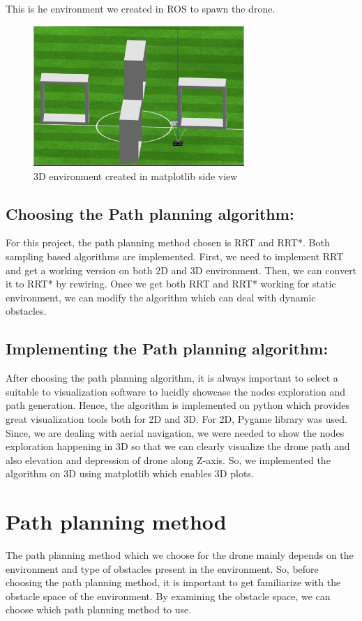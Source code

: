 \documentclass{IEEEtran}
\begin{document}
\newline
This is he environment we created in ROS to spawn the drone.
\newpage
\begin{figure}[h]
    \centering
    \includegraphics[width=8cm]{gazebo}
    \caption{3D environment created in matplotlib side view}
    \label{fig:3D environment created in matplotlib}
\end{figure}
\subsection{\textbf{Choosing the Path planning algorithm:}}
For this project, the path planning method chosen is RRT and RRT*. Both sampling based algorithms are implemented. First, we need to implement RRT and get a working version on both 2D and 3D environment. Then, we can convert it to RRT* by rewiring. Once we get both RRT and RRT* working for static environment, we can modify the algorithm which can deal with dynamic obstacles.

\subsection{\textbf{Implementing the Path planning algorithm:}}
After choosing the path planning algorithm, it is always important to select a suitable to visualization software to lucidly showcase the nodes exploration and path generation. Hence, the algorithm is implemented on python which provides great visualization tools both for 2D and 3D. For 2D, Pygame library was used. Since, we are dealing with aerial navigation, we were needed to show the nodes exploration happening in 3D so that we can clearly visualize the drone path and also elevation and depression of drone along Z-axis. So, we implemented the algorithm on 3D using matplotlib which enables 3D plots.
\section{\textbf{Path planning method}} 
The path planning method which we choose for the drone mainly depends on the environment and type of obstacles present in the environment. So, before choosing the path planning method, it is important to get familiarize with the obstacle space of the environment. By examining the obstacle space, we can choose which path planning method to use. 
\end{document}
